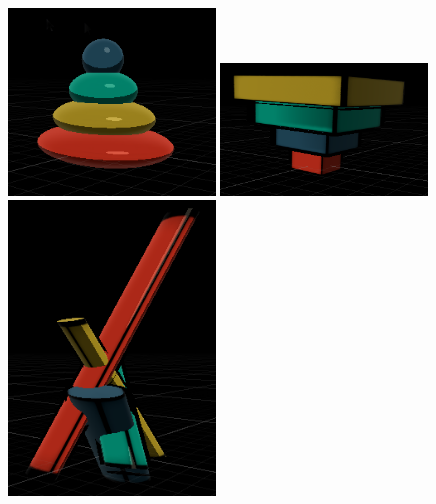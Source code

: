 \begin{figure}[p]
  \centering
  \includegraphics[width=0.49\textwidth, height=0.49\textwidth]{images/workflow/object_morphing/Obj_1.png}
  \includegraphics[width=0.49\textwidth, height=0.49\textwidth]{images/workflow/object_morphing/Obj_2.png} \\[\picVdist]
  \includegraphics[width=0.49\textwidth, height=1\textwidth]{images/workflow/object_morphing/Obj_3.png}

\end{figure}
